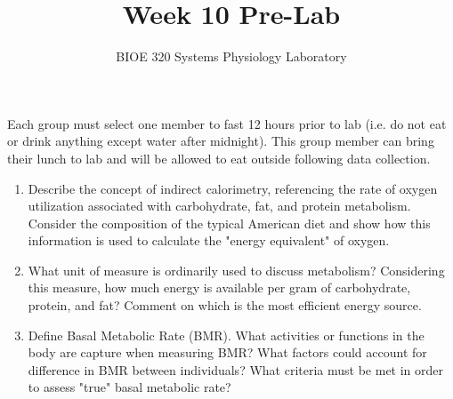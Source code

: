 \documentclass{article}
\title{Week 10 Pre-Lab}
\author{BIOE 320 Systems Physiology Laboratory}
\date{}
\begin{document}
\maketitle
\large

\begin{info}
	Each group must select one member to fast 12 hours prior to lab (i.e. do not eat or drink anything except water after midnight). This group member can bring their lunch to lab and will be allowed to eat outside following data collection.
\end{info}

\begin{enumerate}
	\item Describe the concept of indirect calorimetry, referencing the rate of oxygen utilization associated with carbohydrate, fat, and protein metabolism. Consider the composition of the typical American diet and show how this information is used to calculate the "energy equivalent" of oxygen.
	\item What unit of measure is ordinarily used to discuss metabolism? Considering this measure, how much energy is available per gram of carbohydrate, protein, and fat? Comment on which is the most efficient energy source.
	\item Define Basal Metabolic Rate (BMR). What activities or functions in the body are capture when measuring BMR? What factors could account for difference in BMR between individuals? What criteria must be met in order to assess "true" basal metabolic rate?
\end{enumerate}
\end{document}

